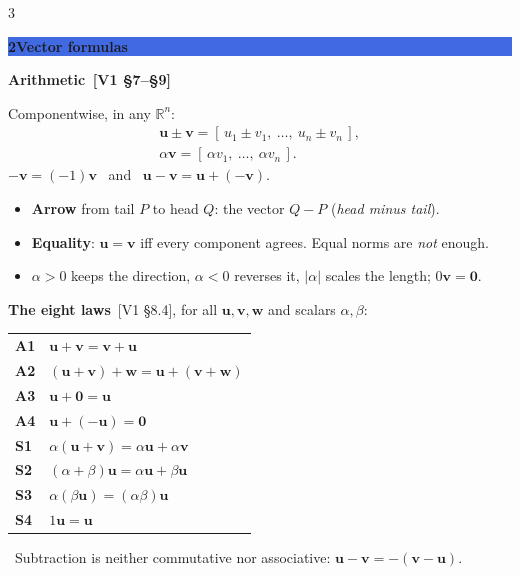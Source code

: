 \documentclass[8pt]{extarticle}
\newcommand{\sect}[2]{\par\vspace{4pt}\noindent
  \colorbox{RoyalBlue}{\parbox{\dimexpr\linewidth-2\fboxsep}{%
    \color{white}\bfseries\sffamily\normalsize #1\enspace #2}}\par\vspace{2pt}}
\newcommand{\sub}[1]{\par\vspace{3pt}\noindent
  {\color{RoyalBlue}\bfseries\sffamily #1}\par\vspace{0.5pt}}
\newcommand{\src}[1]{{\color{gray}\,[#1]}}
\newcommand{\warn}[1]{\par\noindent{\color{BrickRed}\bfseries!}\ #1\par}
\newcommand{\R}{\mathbb{R}}
\newcommand{\vc}[1]{\mathbf{#1}}
\begin{document}
\begin{multicols*}{3}
\sect{2}{Vector formulas}
\sub{2.1\enspace Arithmetic \src{V1 \S7--\S9}}
Componentwise, in any $\R^{n}$:
\begin{gather*}
  \vc{u}\pm\vc{v}=[\,u_1\pm v_1,\ \dots,\ u_n\pm v_n\,],\\
  \alpha\vc{v}=[\,\alpha v_1,\ \dots,\ \alpha v_n\,].
\end{gather*}
$-\vc{v}=(-1)\vc{v}$ \ and \ $\vc{u}-\vc{v}=\vc{u}+(-\vc{v})$.
\begin{itemize}
  \item \textbf{Arrow} from tail $P$ to head $Q$: the vector $Q-P$
        (\emph{head minus tail}).
  \item \textbf{Equality}: $\vc{u}=\vc{v}$ iff every component agrees. Equal
        norms are \emph{not} enough.
  \item $\alpha>0$ keeps the direction, $\alpha<0$ reverses it,
        $\lvert\alpha\rvert$ scales the length; $0\vc{v}=\vc{0}$.
\end{itemize}
\textbf{The eight laws} \src{V1 \S8.4}, for all $\vc{u},\vc{v},\vc{w}$ and
scalars $\alpha,\beta$:

\begin{tabular}{@{}l l@{}}
\textbf{A1} & $\vc{u}+\vc{v}=\vc{v}+\vc{u}$ \\
\textbf{A2} & $(\vc{u}+\vc{v})+\vc{w}=\vc{u}+(\vc{v}+\vc{w})$ \\
\textbf{A3} & $\vc{u}+\vc{0}=\vc{u}$ \\
\textbf{A4} & $\vc{u}+(-\vc{u})=\vc{0}$ \\
\textbf{S1} & $\alpha(\vc{u}+\vc{v})=\alpha\vc{u}+\alpha\vc{v}$ \\
\textbf{S2} & $(\alpha+\beta)\vc{u}=\alpha\vc{u}+\beta\vc{u}$ \\
\textbf{S3} & $\alpha(\beta\vc{u})=(\alpha\beta)\vc{u}$ \\
\textbf{S4} & $1\vc{u}=\vc{u}$ \\
\end{tabular}

\warn{Subtraction is neither commutative nor associative:
$\vc{u}-\vc{v}=-(\vc{v}-\vc{u})$.}


\end{multicols*}
\end{document}
